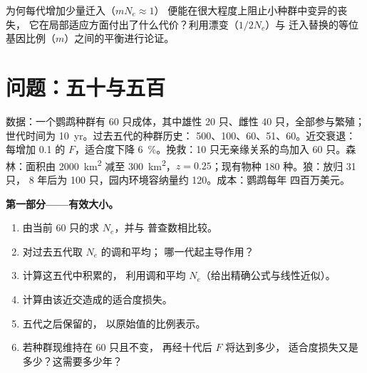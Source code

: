 \begin{exercise}[$\star\star\star$]\label{exo:b3:conservation-biology:12}
为何每代增加少量迁入（$m N_{e} \approx 1$）
便能在很大程度上阻止小种群中变异的丧失，
它在局部适应方面付出了什么代价？利用漂变（$1/2N_{e}$）与
迁入替换的等位基因比例（$m$）之间的平衡进行论证。
\end{exercise}

\section{问题：五十与五百}

\begin{problem}
\label{pb:b3:conservation-biology:1}
数据：一个鹦鹉种群有 60 只成体，其中雄性 20 只、雌性 40 只，全部参与繁殖；
世代时间为 \qty{10}{yr}。过去五代的种群历史：
500、100、60、51、60。近交衰退：
每增加 \qty{0.1}{} 的 $F$，适合度下降 \qty{6}{\%}。挽救：10
只无亲缘关系的鸟加入 60 只。森林：面积由 \qty{2000}{km^2} 减至
\qty{300}{km^2}，$z = 0.25$；现有物种 180 种。狼：放归 31 只，
8 年后为 100 只，园内环境容纳量约 120。成本：鹦鹉每年
四百万美元。

\medskip
\noindent\textbf{第一部分——有效大小。}
\begin{enumerate}
  \item 由当前 60 只的求 $N_{e}$，并与
        普查数相比较。
  \item 对过去五代取 $N_{e}$ 的调和平均；
        哪一代起主导作用？
  \item 计算这五代中积累的，
        利用调和平均 $N_{e}$（给出精确公式与线性近似）。
  \item 计算由该近交造成的适合度损失。
  \item 五代之后保留的，
        以原始值的比例表示。
  \item 若种群现维持在 60 只且不变，
        再经十代后 $F$ 将达到多少，
        适合度损失又是多少？这需要多少年？
\end{enumerate}


\end{problem}
